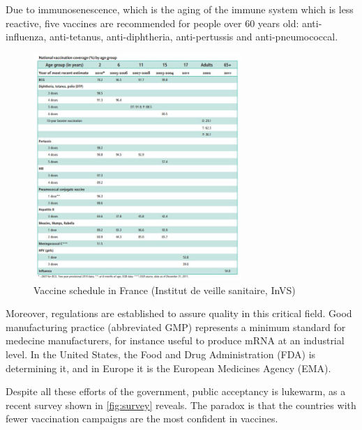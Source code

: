 \documentclass{article}
\begin{document}
            Due to immunosenescence, which is the aging of the immune system which is less reactive, five vaccines are recommended
                for people over 60 years old: anti-influenza, anti-tetanus, anti-diphtheria, anti-pertussis and anti-pneumococcal.

            \begin{figure}
                \centering
                \includegraphics[width=0.7\textwidth]{imgs/VaccineSchedule.JPG}
                \caption{Vaccine schedule in France (Institut de veille sanitaire, InVS) \autocite{spfAssessmentVaccinationCoverage}}
                \label{fig:vacAgenda}
            \end{figure}

            Moreover, regulations are established to assure quality in this critical field.
                Good manufacturing practice (abbreviated GMP) represents a minimum standard for medecine manufacturers,
                for instance useful to produce mRNA at an industrial level. In the United States, the Food and Drug Administration (FDA) is determining it, and in Europe
                it is the European Medicines Agency (EMA).

            Despite all these efforts of the government, public acceptancy is lukewarm, as a recent survey shown in \ref{fig:survey} reveals.
            The paradox is that the countries with fewer vaccination campaigns are the most confident in vaccines.            
                    
\end{document}
